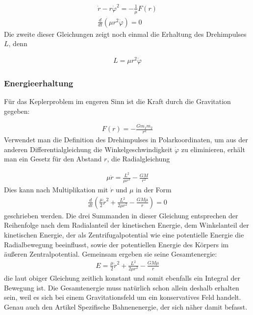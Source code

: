 \documentclass[a4paper,12pt,twoside]{article}
\begin{document}
\begin{align*}
	\dot{r} - r \dot{\varphi}^2 = - \frac{1}{\mu} F(r) \\
	\frac{d}{dt} \left( \mu r^2 \dot{\varphi} \right) = 0
\end{align*}
Die zweite dieser Gleichungen zeigt noch einmal die Erhaltung des Drehimpulses \( L \), denn

\begin{align*}
	L = \mu r^2 \dot{\varphi}
\end{align*}


\subsubsection{Energieerhaltung}
Für das Keplerproblem im engeren Sinn ist die Kraft durch die Gravitation gegeben:

\begin{align*}
	F(r) = - \frac{G m_1 m_2}{r^2}
\end{align*}
Verwendet man die Definition des Drehimpulses in Polarkoordinaten, um aus der anderen Differentialgleichung die Winkelgeschwindigkeit \( \dot{\varphi} \) zu eliminieren, erhält man ein Gesetz für den Abstand \( r \), die Radialgleichung

\begin{align*}
	\mu \ddot{r} = \frac{L^2}{\mu r^3} - \frac{G M}{r^2}
\end{align*}
Dies kann nach Multiplikation mit \( \dot{r} \) und \( \mu \) in der Form
\begin{align*}
	\frac{d}{dt} \left( \frac{\mu}{2} \dot{r}^2 + \frac{L^2}{2 \mu r^2} - \frac{GM \mu}{r} \right) = 0
\end{align*}
geschrieben werden. Die drei Summanden in dieser Gleichung entsprechen der Reihenfolge nach dem Radialanteil der kinetischen Energie, dem Winkelanteil der kinetischen Energie, der als Zentrifugalpotential wie eine potentielle Energie die Radialbewegung beeinflusst, sowie der potentiellen Energie des Körpers im äußeren Zentralpotential. Gemeinsam ergeben sie seine Gesamtenergie:
\begin{align*}
	E = \frac{\mu}{2} \dot{r}^2 + \frac{L^2}{2 \mu r^2} - \frac{GM \mu}{r}
\end{align*}
die laut obiger Gleichung zeitlich konstant und somit ebenfalls ein Integral der Bewegung ist. Die Gesamtenergie muss natürlich schon allein deshalb erhalten sein, weil es sich bei einem Gravitationsfeld um ein konservatives Feld handelt. Genau auch den Artikel Spezifische Bahnenenergie, der sich näher damit befasst.
\end{document}
